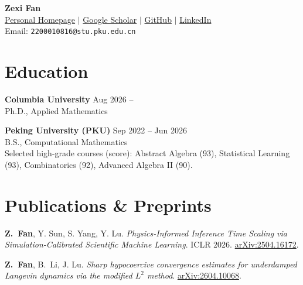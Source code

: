 \documentclass[11pt]{article}
\newlength{\cvitemsep}     \setlength{\cvitemsep}{3pt}  %
\newlength{\projsep}      \setlength{\projsep}{\dimexpr 3\cvitemsep\relax} %
\newcommand{\pubitem}[1]{\vspace{2pt}\noindent\footnotesize #1\vspace{2pt}}
\begin{document}
\begin{center}
  {\LARGE\bfseries Zexi Fan} \\[6pt]
  \footnotesize
  \href{https://francis-fan-create.github.io/}{Personal Homepage} \enspace $\vert$ \enspace
  \href{https://scholar.google.com/citations?user=QX64w3MAAAAJ}{Google Scholar} \enspace $\vert$ \enspace
  \href{https://github.com/Francis-Fan-create}{GitHub} \enspace $\vert$ \enspace
  \href{https://www.linkedin.com/in/zexi-fan-79510a308/}{LinkedIn} \\[6pt]
  \footnotesize Email: \texttt{2200010816@stu.pku.edu.cn}
\end{center}

\section{Education}
\noindent\textbf{Columbia University} \hfill Aug 2026 -- \\
\noindent Ph.D., Applied Mathematics

\vspace{\projsep}

\noindent\textbf{Peking University (PKU)} \hfill Sep 2022 -- Jun 2026 \\
\noindent B.S., Computational Mathematics \\
\noindent Selected high-grade courses (score): Abstract Algebra (93), Statistical Learning (93), Combinatorics (92), Advanced Algebra II (90).

\vspace{\projsep}

\section{Publications \& Preprints}
\pubitem{\textbf{Z.\ Fan}, Y. Sun, S. Yang, Y. Lu. \textit{Physics-Informed Inference Time Scaling via Simulation-Calibrated Scientific Machine Learning}. ICLR 2026. \href{https://arxiv.org/abs/2504.16172}{arXiv:2504.16172}.}

\pubitem{\textbf{Z.\ Fan}, B.\ Li, J. Lu. \textit{Sharp hypocoercive convergence estimates for underdamped Langevin dynamics via the modified $L^2$ method}. \href{https://arxiv.org/abs/2604.10068}{arXiv:2604.10068}.}


\vspace{\projsep}
\end{document}
